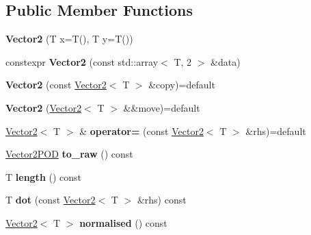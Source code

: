 \subsection*{Public Member Functions}
\begin{DoxyCompactItemize}
\item 
\mbox{\label{class_vector2_aabb780b39b3fd9353d95cc11f3d626c2}} 
{\bfseries Vector2} (T x=T(), T y=T())
\item 
\mbox{\label{class_vector2_ae611e87470765c3e8ed27bdc8971d0ce}} 
constexpr {\bfseries Vector2} (const std\+::array$<$ T, 2 $>$ \&data)
\item 
\mbox{\label{class_vector2_a663fa4a2709dd5666eff6b3cf205e7b0}} 
{\bfseries Vector2} (const \mbox{\hyperlink{class_vector2}{Vector2}}$<$ T $>$ \&copy)=default
\item 
\mbox{\label{class_vector2_ab5412c7d71fe6364dcf3c5eb1e88198a}} 
{\bfseries Vector2} (\mbox{\hyperlink{class_vector2}{Vector2}}$<$ T $>$ \&\&move)=default
\item 
\mbox{\label{class_vector2_ad0c9d983620766819a289bdf958f71d4}} 
\mbox{\hyperlink{class_vector2}{Vector2}}$<$ T $>$ \& {\bfseries operator=} (const \mbox{\hyperlink{class_vector2}{Vector2}}$<$ T $>$ \&rhs)=default
\item 
\mbox{\label{class_vector2_ab4c2e1a3fe9216e506e3ab60c02348b2}} 
\mbox{\hyperlink{struct_vector2_p_o_d}{Vector2\+P\+OD}} {\bfseries to\+\_\+raw} () const
\item 
\mbox{\label{class_vector2_a784391c74b4bd821fc4a6277170c1263}} 
T {\bfseries length} () const
\item 
\mbox{\label{class_vector2_a9f7a1b36270fa93b51546d2b29228e39}} 
T {\bfseries dot} (const \mbox{\hyperlink{class_vector2}{Vector2}}$<$ T $>$ \&rhs) const
\item 
\mbox{\label{class_vector2_aa21618ee0b6e9684da1a5b2d7c8ad3d4}} 
\mbox{\hyperlink{class_vector2}{Vector2}}$<$ T $>$ {\bfseries normalised} () const
\item 
\mbox{\label{class_vector2_af608a3b5bb42148c2260fb0ba9cf0950}} 

\end{DoxyCompactItemize}
